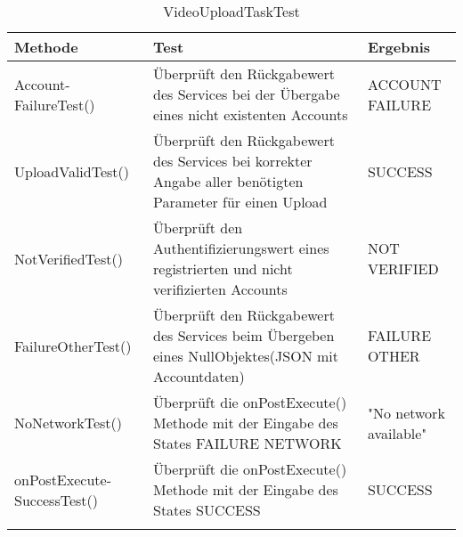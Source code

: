  
\begin{longtable}{p{} | p{} | p{}}
\hline
  \textbf{Methode} & \textbf{Test} & \textbf{Ergebnis}\\
  \hline
  Account- \newline FailureTest() & Überprüft den Rückgabewert des Services bei der Übergabe eines nicht existenten Accounts & ACCOUNT FAILURE \\
  \hline
  UploadValidTest() & Überprüft den Rückgabewert des Services bei korrekter Angabe aller benötigten Parameter für einen Upload  & SUCCESS \\
  \hline
  NotVerifiedTest() & Überprüft den Authentifizierungswert eines registrierten und nicht verifizierten Accounts & NOT VERIFIED \\
  \hline
  FailureOtherTest() & Überprüft den Rückgabewert des Services beim Übergeben eines NullObjektes(JSON mit Accountdaten) & FAILURE OTHER \\
  \hline
  NoNetworkTest() & Überprüft die onPostExecute() Methode mit der Eingabe des States FAILURE NETWORK & "No network available" \\
  \hline
  onPostExecute- \newline SuccessTest() & Überprüft die onPostExecute() Methode mit der Eingabe des States SUCCESS & SUCCESS \\
  \caption{VideoUploadTaskTest}
 \end{longtable}
 
 
                                                      

